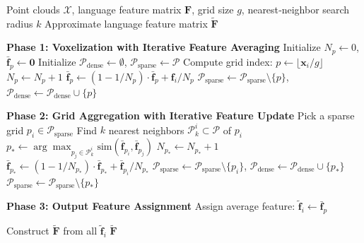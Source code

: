 \documentclass{article}
\begin{document}
\begin{algorithm}[tb]
\caption{Grid feature aggregation.}
\label{alg:algorithm}
\begin{algorithmic}[1] %
\Require Point clouds $\mathcal{X}$, language feature matrix $\mathbf{F}$, grid size $g$, nearest‑neighbor search radius $k$
\Ensure Approximate language feature matrix $\tilde{\mathbf{F}}$

\State \textbf{Phase 1: Voxelization with Iterative Feature Averaging}
\State Initialize $N_p \gets 0$, $\bar{\mathbf{f}}_p \gets \mathbf{0}$ 
\State Initialize $\mathcal{P}_{\text{dense}} \gets \emptyset$, $\mathcal{P}_{\text{sparse}} \gets \mathcal{P}$ 
    \State Compute grid index: $p \gets \lfloor \mathbf{x}_i / g \rfloor$
    \State $N_p \gets N_p + 1$ 
    \State $\bar{\mathbf{f}}_p \gets (1-1/{N_p}) \cdot \bar{\mathbf{f}}_p + \mathbf{f}_i/{N_p}$ 
     
        \State $\mathcal{P}_{\text{sparse}} \gets \mathcal{P}_{\text{sparse}} \setminus \{p\}$,  $\mathcal{P}_{\text{dense}} \gets \mathcal{P}_{\text{dense}} \cup \{p\}$
    \EndIf
\EndFor

\State \textbf{Phase 2: Grid Aggregation with Iterative Feature Update}
    \State Pick a sparse grid $p_i \in \mathcal{P}_{\text{sparse}}$
    \State Find $k$ nearest neighbors $\mathcal{P}_k^i \subset \mathcal{P}$ of $p_i$
    \State $p_* \gets \arg\max_{p_j \in \mathcal{P}_k^i} \text{sim}(\bar{\mathbf{f}}_{p_i}, \bar{\mathbf{f}}_{p_j})$
    \State $N_{p_*} \gets N_{p_*} + 1$ 
    \State $\bar{\mathbf{f}}_{p_*} \gets (1 - 1/N_{p_*}) \cdot \bar{\mathbf{f}}_{p_*} + \bar{\mathbf{f}}_{p_i} / N_{p_*}$ 
    \State $\mathcal{P}_{\text{sparse}} \gets \mathcal{P}_{\text{sparse}} \setminus \{p_i\}$, $\mathcal{P}_{\text{dense}} \gets \mathcal{P}_{\text{dense}} \cup \{p_*\}$ 
        \State $\mathcal{P}_{\text{sparse}} \gets \mathcal{P}_{\text{sparse}} \setminus \{p_*\}$
    \EndIf
\EndWhile

\State \textbf{Phase 3: Output Feature Assignment}
        \State Assign average feature: $\tilde{\mathbf{f}}_i \gets \bar{\mathbf{f}}_p$
    \EndFor
\EndFor

\State Construct $\tilde{\mathbf{F}}$ from all $\tilde{\mathbf{f}}_i$
\State \Return $\tilde{\mathbf{F}}$

\end{algorithmic}
\end{algorithm}
\end{document}
